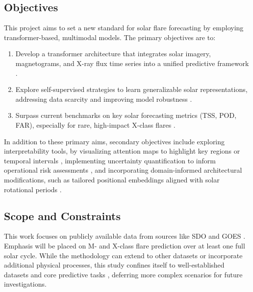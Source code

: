 \subsection{Objectives}
This project aims to set a new standard for solar flare forecasting by employing transformer-based, multimodal models. The primary objectives are to:

\begin{enumerate}
\item Develop a transformer architecture that integrates solar imagery, magnetograms, and X-ray flux time series into a unified predictive framework \cite{RefWorks:RefID:2-abduallah2023operational, RefWorks:RefID:12-zheng2023comparative}.
\item Explore self-supervised strategies to learn generalizable solar representations, addressing data scarcity and improving model robustness \cite{RefWorks:RefID:21-fedus2022switch, RefWorks:RefID:29-hoffmanntraining}.
\item Surpass current benchmarks on key solar forecasting metrics (TSS, POD, FAR), especially for rare, high-impact X-class flares \cite{RefWorks:RefID:2-abduallah2023operational, RefWorks:RefID:14-hayes2021solar}.
\end{enumerate}

In addition to these primary aims, secondary objectives include exploring interpretability tools, by visualizing attention maps to highlight key regions or temporal intervals \cite{RefWorks:RefID:2-abduallah2023operational}, implementing uncertainty quantification to inform operational risk assessments \cite{RefWorks:RefID:2-abduallah2023operational}, and incorporating domain-informed architectural modifications, such as tailored positional embeddings aligned with solar rotational periods \cite{RefWorks:RefID:15-harra2016characteristics, RefWorks:RefID:7-schrijver2009driving}.

\subsection{Scope and Constraints}
This work focuses on publicly available data from sources like SDO and GOES \cite{RefWorks:RefID:13-yıldız2023effect, RefWorks:RefID:6-omatolaimpacts}. Emphasis will be placed on M- and X-class flare prediction over at least one full solar cycle. While the methodology can extend to other datasets or incorporate additional physical processes, this study confines itself to well-established datasets and core predictive tasks \cite{RefWorks:RefID:1-gettelman1997future}, deferring more complex scenarios for future investigations.